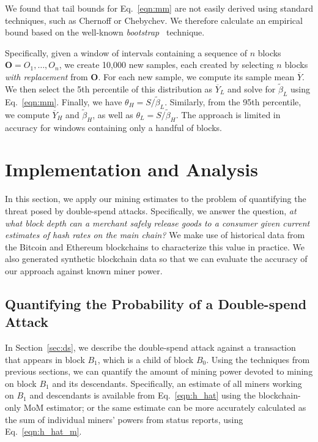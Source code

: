 \documentclass[10pt,sigconf]{acmart}
\newcommand{\1}{{\em (i)}}
\newcommand{\2}{{\em (ii)}}
\newcommand{\3}{{\em (iii)}}
\newcommand{\4}{{\em (iv)}}
\newcommand{\5}{{\em (v)}}
\begin{document}
We found that tail bounds for Eq.~\ref{eqn:mm} are not easily derived
using standard techniques, such as Chernoff or Chebychev. We therefore
calculate an empirical bound based on the well-known {\em
  bootstrap}~\cite{Efron:1982,Casella:2002} technique.
  
Specifically, given a window of intervals containing a sequence of $n$ blocks $\textbf{O}= O_1,\ldots,O_n$, we create 10,000 new samples, each created by selecting $n$ blocks {\em with replacement} from $\textbf{O}$. For each new sample, we compute its sample mean $\overline{Y}$. We then select the 5th percentile of this distribution as $\overline{Y}_L$ and solve for $\tilde\beta_{L}$ using Eq.~\ref{eqn:mm}. Finally, we have 
$\theta_{H}=S/\tilde\beta_{L}$.  Similarly, from the 95th percentile, we compute $\overline{Y}_H$ and $\tilde\beta_{H}$, as well as $\theta_{L}=S/\tilde\beta_{H}$. The approach is limited in accuracy for  windows containing only a handful of blocks.

\section{Implementation and Analysis}\label{sec:implementation-analysis}

 In this section, we apply our mining estimates to the problem of
quantifying the threat posed by double-spend attacks. Specifically, we
answer the question, {\em at what block depth can a merchant safely
  release goods to a consumer given current estimates of hash rates on
  the main chain?} We make use of historical data from the Bitcoin and
Ethereum blockchains to characterize this value in practice. We also
generated synthetic blockchain data so that we can evaluate the
accuracy of our approach against known miner power.

\subsection{Quantifying the Probability of a Double-spend Attack}


In Section~\ref{sec:ds}, we describe the double-spend attack against a transaction that appears in block $B_1$, which is a child of block $B_0$.
Using the techniques from previous sections, we can quantify the
amount of mining power devoted to mining on block $B_1$ and its
descendants. Specifically, an estimate of all miners working on $B_1$
and descendants is available from Eq.~\ref{eqn:h_hat} using the
blockchain-only MoM estimator; or the same estimate can be more accurately
calculated as the sum of individual miners' powers from status
reports, using Eq.~\ref{eqn:h_hat_m}.
\end{document}
